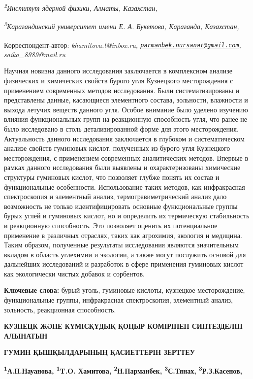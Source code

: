 \emph{\textsuperscript{2}Институт ядерной физики, Алматы, Казахстан,}

\emph{\textsuperscript{3}Карагандинский университет имени Е. А.
Букетова, Караганда, Казахстан,}

{\bfseries \textsuperscript{\envelope }}Корреспондент-автор:
\emph{khamitova.t@inbox.ru,
\href{mailto:parmanbek.nursanat@gmail.com}{\nolinkurl{parmanbek.nursanat@gmail.com}},
saika\_8989@mail.ru}

Научная новизна данного исследования заключается в комплексном анализе
физических и химических свойств бурого угля Кузнецкого месторождения с
применением современных методов исследования. Были систематизированы и
представлены данные, касающиеся элементного состава, зольности,
влажности и выхода летучих веществ данного угля. Особое внимание было
уделено изучению влияния функциональных групп на реакционную способность
угля, что ранее не было исследовано в столь детализированной форме для
этого месторождения. Актуальность данного исследования заключается в
глубоком и систематическом анализе свойств гуминовых кислот, полученных
из бурого угля Кузнецкого месторождения, с применением современных
аналитических методов. Впервые в рамках данного исследования были
выявлены и охарактеризованы химические структуры гуминовых кислот, что
позволяет глубже понять их состав и функциональные особенности.
Использование таких методов, как инфракрасная спектроскопия и элементный
анализ, термогравиметрический анализ дало возможность не только
идентифицировать основные функциональные группы бурых углей и гуминовых
кислот, но и определить их термическую стабильность и реакционную
способность. Это позволяет оценить их потенциальное применение в
различных отраслях, таких как агрохимия, экология и медицина. Таким
образом, полученные результаты исследования являются значительным
вкладом в область углехимии и экологии, а также могут послужить основой
для дальнейших исследований и разработок в сфере применения гуминовых
кислот как экологически чистых добавок и сорбентов.

{\bfseries Ключевые слова:} бурый уголь, гуминовые кислоты, кузнецкое
месторождение, функциональные группы, инфракрасная спектроскопия,
элементный анализ, зольность, реакционная способность.

{\bfseries КУЗНЕЦК ЖӘНЕ КҮМІСҚҰДЫҚ ҚОҢЫР КӨМІРІНЕН СИНТЕЗДЕЛІП АЛЫНАТЫН}

{\bfseries ГУМИН ҚЫШҚЫЛДАРЫНЫҢ ҚАСИЕТТЕРІН ЗЕРТТЕУ}

{\bfseries \textsuperscript{1}А.П.Науанова, \textsuperscript{1}T.O.
Хамитова\textsuperscript{\envelope },
\textsuperscript{2}Н.Парманбек\textsuperscript{\envelope },
\textsuperscript{3}С.Тянах\textsuperscript{\envelope },
\textsuperscript{3}Р.З.Касенов,}


